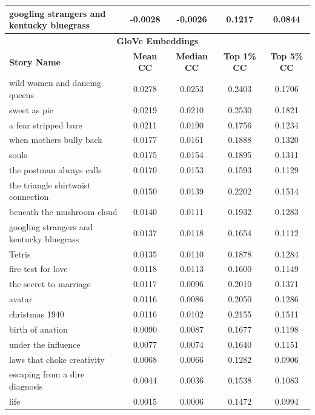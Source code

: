 \documentclass{article}
\begin{document}
\begin{table}[H]
\begin{tabular}{lcccc}
    googling strangers and kentucky bluegrass & -0.0028 & -0.0026 & 0.1217 & 0.0844 \\
    \hline
    \multicolumn{5}{c}{\textbf{GloVe Embeddings}} \\
    \hline
    \textbf{Story Name} & \textbf{Mean CC} & \textbf{Median CC} & \textbf{Top 1\% CC} & \textbf{Top 5\% CC} \\
    \hline
    wild women and dancing queens & 0.0278 & 0.0253 & 0.2403 & 0.1706 \\
    sweet as pie                  & 0.0219 & 0.0210 & 0.2530 & 0.1821 \\
    a fear stripped bare           & 0.0211 & 0.0190 & 0.1756 & 0.1234 \\
    when mothers bully back        & 0.0177 & 0.0161 & 0.1888 & 0.1320 \\
    souls                       & 0.0175 & 0.0154 & 0.1895 & 0.1311 \\
    the postman always calls       & 0.0170 & 0.0153 & 0.1593 & 0.1129 \\
    the triangle shirtwaist connection & 0.0150 & 0.0139 & 0.2202 & 0.1514 \\
    beneath the mushroom cloud     & 0.0140 & 0.0111 & 0.1932 & 0.1283 \\
    googling strangers and kentucky bluegrass & 0.0137 & 0.0118 & 0.1654 & 0.1112 \\
    Tetris                      & 0.0135 & 0.0110 & 0.1878 & 0.1284 \\
    fire test for love             & 0.0118 & 0.0113 & 0.1600 & 0.1149 \\
    the secret to marriage         & 0.0117 & 0.0096 & 0.2010 & 0.1371 \\
    avatar                      & 0.0116 & 0.0086 & 0.2050 & 0.1286 \\
    christmas 1940               & 0.0116 & 0.0102 & 0.2155 & 0.1511 \\
    birth of anation              & 0.0090 & 0.0087 & 0.1677 & 0.1198 \\
    under the influence           & 0.0077 & 0.0074 & 0.1640 & 0.1151 \\
    laws that choke creativity     & 0.0068 & 0.0066 & 0.1282 & 0.0906 \\
    escaping from a dire diagnosis  & 0.0044 & 0.0036 & 0.1538 & 0.1083 \\
    life                        & 0.0015 & 0.0006 & 0.1472 & 0.0994 \\
    \hline
  \end{tabular}
\end{table}
\end{document}
